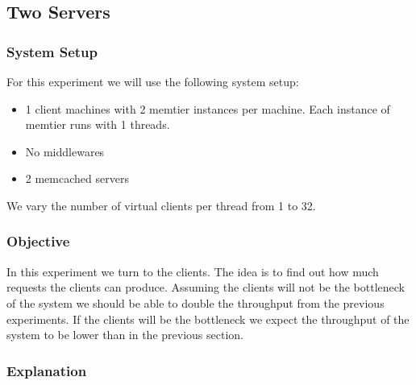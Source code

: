 \documentclass[11pt,a4paper]{article}
\begin{document}
\subsection{Two Servers}
%
\subsubsection{System Setup}
%
For this experiment we will use the following system setup:
%
\begin{itemize}
	\item 1 client machines with 2 memtier instances per machine. Each instance of memtier runs with 1 threads.
	\item No middlewares
	\item 2 memcached servers
\end{itemize}
%
We vary the number of virtual clients per thread from 1 to 32.
%
\subsubsection{Objective}
%
In this experiment we turn to the clients.
%
The idea is to find out how much requests the clients can produce.
%
Assuming the clients will not be the bottleneck of the system we should be able to double the throughput from the previous experiments.
%
If the clients will be the bottleneck we expect the throughput of the system to be lower than in the previous section.
%
\subsubsection{Explanation}
%
\end{document}
